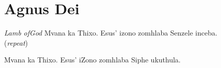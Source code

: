 \starttocol
\chapter{Agnus Dei}
\nexttocol
\hfill{\it Lamb ofGod}
\stoptocol
\starttocol
\startlines
{\sc Mvana} ka Thixo.
Esus' izono zomhlaba
Senzele inceba.          \hfill({\it repeat})~~~~~~~~~

Mvana ka Thixo.
Esus' iZono zomhlaba
Siphe ukuthula.
\stoplines
\nexttocol

\stoptocol
